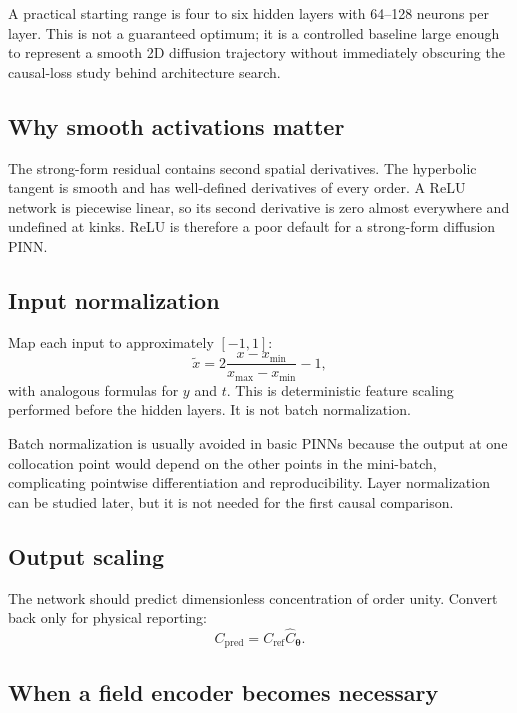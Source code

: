 \documentclass[11pt]{article}
\newcommand{\thetav}{\bm{\theta}}
\newcommand{\Cref}{C_{\mathrm{ref}}}
\begin{document}
A practical starting range is four to six hidden layers with 64--128 neurons per layer. This is not a guaranteed optimum; it is a controlled baseline large enough to represent a smooth 2D diffusion trajectory without immediately obscuring the causal-loss study behind architecture search.

\subsection{Why smooth activations matter}

The strong-form residual contains second spatial derivatives. The hyperbolic tangent is smooth and has well-defined derivatives of every order. A ReLU network is piecewise linear, so its second derivative is zero almost everywhere and undefined at kinks. ReLU is therefore a poor default for a strong-form diffusion PINN.

\subsection{Input normalization}

Map each input to approximately $[-1,1]$:
\begin{equation}
\tilde{x}
=
2\frac{x-x_{\min}}{x_{\max}-x_{\min}}-1,
\end{equation}
with analogous formulas for $y$ and $t$. This is deterministic feature scaling performed before the hidden layers. It is not batch normalization.

Batch normalization is usually avoided in basic PINNs because the output at one collocation point would depend on the other points in the mini-batch, complicating pointwise differentiation and reproducibility. Layer normalization can be studied later, but it is not needed for the first causal comparison.

\subsection{Output scaling}

The network should predict dimensionless concentration of order unity. Convert back only for physical reporting:
\begin{equation}
C_{\mathrm{pred}}
=
\Cref\widehat{C}_{\thetav}.
\end{equation}

\subsection{When a field encoder becomes necessary}
\end{document}
